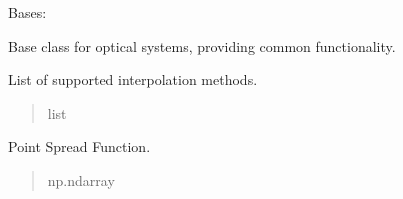 \documentclass[letterpaper,10pt,english]{sphinxmanual}
\begin{document}
\begin{fulllineitems}
\label{\detokenize{source/OpticalSystems:OpticalSystems.OpticalSystem}}
\pysigstartsignatures
\pysiglinewithargsret
{}
{}
{}
\pysigstopsignatures
\sphinxAtStartPar
Bases: 

\sphinxAtStartPar
Base class for optical systems, providing common functionality.

\begin{fulllineitems}
\label{\detokenize{source/OpticalSystems:OpticalSystems.OpticalSystem.supported_interpolation_methods}}
\pysigstartsignatures
\pysigline
{}
\pysigstopsignatures
\sphinxAtStartPar
List of supported interpolation methods.
\begin{quote}\begin{description}
\sphinxAtStartPar
list

\end{description}\end{quote}

\end{fulllineitems}


\begin{fulllineitems}
\label{\detokenize{source/OpticalSystems:OpticalSystems.OpticalSystem.psf}}
\pysigstartsignatures
\pysigline
{}
\pysigstopsignatures
\sphinxAtStartPar
Point Spread Function.
\begin{quote}\begin{description}
\sphinxAtStartPar
np.ndarray

\end{description}\end{quote}

\end{fulllineitems}



\end{fulllineitems}
\end{document}
